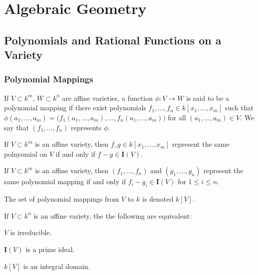 \documentclass[crop=false,class=article,oneside]{standalone}
\begin{document}
    \ifx\ifmathcoursesalgebraicgeometry\undefined
        \section*{Algebraic Geometry}
        \setcounter{section}{1}
    \fi
    \subsection{Polynomials and Rational Functions on a Variety}
        \subsubsection{Polynomial Mappings}
            \begin{definition}
                If $V\subset k^m$, $W\subset k^n$ are affine
                varieties, a function $\phi:V\rightarrow W$ is
                said to be a polynomial mapping if there exist
                polynomials $f_1,\hdots, f_n\in k[x_1,\hdots, x_m]$
                such that
                $\phi(a_1,\hdots, a_m)%
                 =\big(%
                     f_1(a_1,\hdots,a_m),\hdots,f_n(a_1,\hdots, a_m)%
                  \big)$
                for all $(a_1,\hdots, a_m) \in V$. We say that
                $(f_1,\hdots, f_n)$ represents $\phi$.
            \end{definition}
            \begin{theorem}
                If $V\subset k^m$ is an affine variety,
                then $f,g\in k[x_1,\hdots, x_m]$ represent the
                same polnyomial on $V$ if and only if
                $f-g\in\textbf{I}(V)$.
            \end{theorem}
            \begin{theorem}
                If $V\subset k^m$ is an affine variety, then
                $(f_1,\hdots, f_n)$ and $(g_1,\hdots, g_n)$
                represent the same polynomial mapping if and only
                if $f_i-g_i \in \textbf{I}(V)$ for $1\leq i \leq n$.
            \end{theorem}
            \begin{notation}
                The set of polynomial mappings from
                $V$ to $k$ is denoted $k[V]$.
            \end{notation}
            \begin{theorem}
                If $V\subset k^n$ is an affine variety,
                the the following are equivalent:
                \begin{enumerate}
                    \begin{multicols}{3}
                        \item $V$ is irreducible.
                        \item $\textbf{I}(V)$ is a prime ideal.
                        \item $k[V]$ is an integral domain.
                    \end{multicols}
                \end{enumerate}
            \end{theorem}
\end{document}

